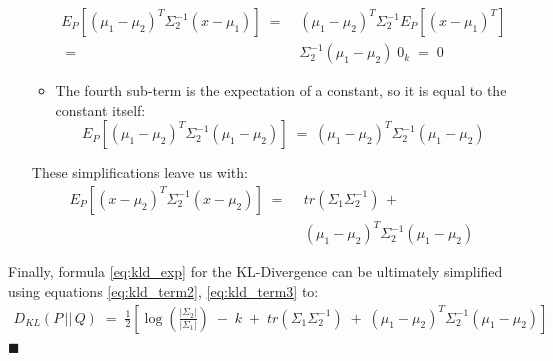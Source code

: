 \documentclass[12pt]{report}
\newcommand*{\QEDA}{\hfill\ensuremath{\blacksquare}}
\begin{document}
\begin{itemize}
\begin{itemize}
\begin{align*}
                    E_P \left[ (\mu_1 - \mu_2)^T\Sigma_2^{-1}(x - \mu_1) \right]
                    \;=&\; (\mu_1 - \mu_2)^T\Sigma_2^{-1}
                        E_P \left[ (x - \mu_1)^T \right] \\
                    \;=&\; \Sigma_2^{-1}(\mu_1 - \mu_2) \; 0_k \;=\; 0
                \end{align*}
            \item The fourth sub-term is the expectation of a constant, so it is equal
                to the constant itself:
                $$E_P \left[ (\mu_1 - \mu_2)^T\Sigma_2^{-1}(\mu_1 - \mu_2)\right] \;=\;
                (\mu_1 - \mu_2)^T\Sigma_2^{-1}(\mu_1 - \mu_2)$$
        \end{itemize}
    These simplifications leave us with:
    \begin{align}\label{eq:kld_term3}
        E_P \left[ (x - \mu_2)^T\Sigma_2^{-1} (x - \mu_2) \right] \;=\;\,
        &tr(\Sigma_1\Sigma_2^{-1}) \,+ \nonumber \\
        &(\mu_1 - \mu_2)^T\Sigma_2^{-1}(\mu_1 - \mu_2)
    \end{align}
\end{itemize}

\noindent Finally, formula \eqref{eq:kld_exp} for the KL-Divergence can be ultimately
simplified using equations \eqref{eq:kld_term2}, \eqref{eq:kld_term3} to:
\begin{align}
    D_{KL} (P \,||\, Q) \;=\;
    \frac{1}{2}\left[ \log\left(\frac{|\Sigma_2|}{|\Sigma_1|}\right) \;-\;
    k \;+\;
    tr(\Sigma_1\Sigma_2^{-1}) \;+\; (\mu_1 - \mu_2)^T\Sigma_2^{-1}(\mu_1 - \mu_2) \right]
\end{align}
\QEDA
\clearpage

\end{document}

